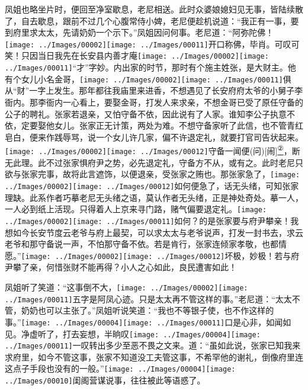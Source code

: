 凤姐也略坐片时，便回至净室歇息，老尼相送。此时众婆娘媳妇见无事，皆陆续散了，自去歇息，跟前不过几个心腹常侍小婢，老尼便趁机说道：``我正有一事，要到府里求太太，先请奶奶一个示下。''凤姐因问何事。老尼道：``阿弥陀佛！{\texttt{[image: ../Images/00002]}\texttt{[image: ../Images/00011]}\footnotesize \kaishu 开口称佛，毕肖。可叹可笑！}只因当日我先在长安县内善才庵{\texttt{[image: ../Images/00002]}\texttt{[image: ../Images/00011]}\footnotesize \kaishu ``才''字妙。}内出家的时节，那时有个施主姓张，是大财主。他有个女儿小名金哥，{\texttt{[image: ../Images/00002]}\texttt{[image: ../Images/00011]}\footnotesize \kaishu 俱从``财''一字上发生。}那年都往我庙里来进香，不想遇见了长安府府太爷的小舅子李衙内。那李衙内一心看上，要娶金哥，打发人来求亲，不想金哥已受了原任守备的公子的聘礼。张家若退亲，又怕守备不依，因此说有了人家。谁知李公子执意不依，定要娶他女儿。张家正无计策，两处为难。不想守备家听了此信，也不管青红皂白，便来作践辱骂，说一个女儿许几家，偏不许退定礼，就要打官司告状起来。{{\texttt{[image: ../Images/00002]}\texttt{[image: ../Images/00012]}\footnotesize \kaishu 守备一闻便{(问)}{[}闹{]}}}\href{../Text/part0019_split_000.html\#lnkback_2_a}{\textsuperscript{②}}{，断无此理。此不过张家惧府尹之势，必先退定礼，守备方不从，或有之。此时老尼只欲与张家完事，故将此言遮饰，以便退亲，受张家之贿也。}那张家急了，{\texttt{[image: ../Images/00002]}\texttt{[image: ../Images/00012]}\footnotesize \kaishu 如何便急了，话无头绪，可知张家理缺。此系作者巧摹老尼无头绪之语，莫认作者无头绪，正是神处奇处。摹一人，一人必到纸上活现。}只得着人上京来寻门路，赌气偏要退定礼。{\texttt{[image: ../Images/00002]}\texttt{[image: ../Images/00011]}\footnotesize \kaishu 如何？的是张家要与府尹攀亲！}我想如今长安节度云老爷与府上最契，可以求太太与老爷说声，打发一封书去，求云老爷和那守备说一声，不怕那守备不依。若是肯行，张家连倾家孝敬，也都情愿。''{\texttt{[image: ../Images/00002]}\texttt{[image: ../Images/00012]}\footnotesize \kaishu 坏极，妙极！若与府尹攀了亲，何惜张财不能再得？小人之心如此，良民遭害如此！}

凤姐听了笑道：``这事倒不大，{\texttt{[image: ../Images/00002]}\texttt{[image: ../Images/00011]}\footnotesize \kaishu 五字是阿凤心迹。}只是太太再不管这样的事。''老尼道：``太太不管，奶奶也可以主张了。''凤姐听说笑道：``我也不等银子使，也不作这样的事。''{\texttt{[image: ../Images/00004]}\texttt{[image: ../Images/00011]}\footnotesize \kaishu 口是心非，如闻如见。}净虚听了，打去妄想，半晌叹{\texttt{[image: ../Images/00004]}\texttt{[image: ../Images/00011]}\footnotesize \kaishu 一叹转出多少至恶不畏之文来。}道：``虽如此说，张家已知我来求府里，如今不管这事，张家不知道没工夫管这事，不希罕他的谢礼，倒像府里连这点子手段也没有的一般。''{\texttt{[image: ../Images/00004]}\texttt{[image: ../Images/00010]}\footnotesize \kaishu 闺阁营谋说事，往往被此等语惑了。}

